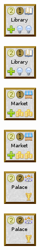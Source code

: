 \documentclass{article}
\begin{document}
\begin{figure}
  \begin{subfigure}{}
    \includegraphics[scale=1]{../rules/png/doe_building_library.png}
  \end{subfigure}
  \begin{subfigure}{}
    \includegraphics[scale=1]{../rules/png/doe_building_library.png}
  \end{subfigure}
  \begin{subfigure}{}
    \includegraphics[scale=1]{../rules/png/doe_building_market.png}
  \end{subfigure}
  \begin{subfigure}{}
    \includegraphics[scale=1]{../rules/png/doe_building_market.png}
  \end{subfigure}
  \begin{subfigure}{}
    \includegraphics[scale=1]{../rules/png/doe_building_palace.png}
  \end{subfigure}
  \begin{subfigure}{}
    \includegraphics[scale=1]{../rules/png/doe_building_palace.png}
  \end{subfigure}
  \begin{subfigure}{}

\end{subfigure}
\end{figure}
\end{document}
